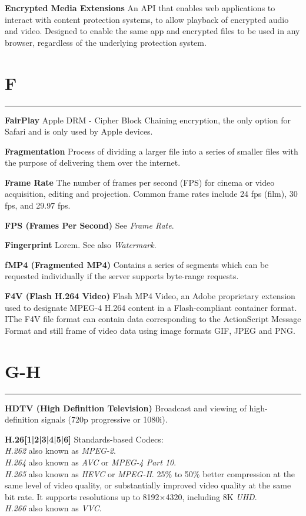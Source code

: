 \smallskip
\textbf{Encrypted Media Extensions}
An API that enables web applications to interact with content protection systems, to allow playback of encrypted audio and video. Designed to enable the same app and encrypted files to be used in any browser, regardless of the underlying protection system.

\section{F}
\hrule

\medskip
\textbf{FairPlay}
Apple DRM - Cipher Block Chaining encryption, the only option for Safari and is only used by Apple devices.

\smallskip
\textbf{Fragmentation}
Process of dividing a larger file into a series of smaller files with the purpose of delivering them over the internet.

\textbf{Frame Rate}
The number of frames per second (FPS) for cinema or video acquisition, editing and projection. Common frame rates include 24 fps (film), 30 fps, and 29.97 fps.

\textbf{FPS (Frames Per Second)}
See \textit{Frame Rate}.

\smallskip
\textbf{Fingerprint}
Lorem. See also \textit{Watermark}.

\smallskip
\textbf{fMP4 (Fragmented MP4)}
Contains a series of segments which can be requested individually if the server supports byte-range requests.

\smallskip
\textbf{F4V (Flash H.264 Video)}
Flash MP4 Video, an Adobe proprietary extension used to designate MPEG-4 H.264 content in a Flash-compliant container format. IThe F4V file format can contain data corresponding to the ActionScript Message Format and still frame of video data using image formats GIF, JPEG and PNG.

\section{G-H}
\hrule

\medskip
\textbf{HDTV (High Definition Television)}
Broadcast and viewing of high-definition signals (720p progressive or 1080i).

\smallskip
\textbf{H.26[1|2|3|4|5|6]}
Standards-based Codecs:\\
\textit{H.262} also known as \textit{MPEG-2}.\\
\textit{H.264} also known as \textit{AVC} or  \textit{MPEG-4 Part 10}.\\
\textit{H.265} also known as \textit{HEVC} or \textit{MPEG-H}. 25\% to 50\% better compression at the same level of video quality, or substantially improved video quality at the same bit rate. It supports resolutions up to 8192×4320, including 8K \textit{UHD}.\\
\textit{H.266} also known as \textit{VVC}.

